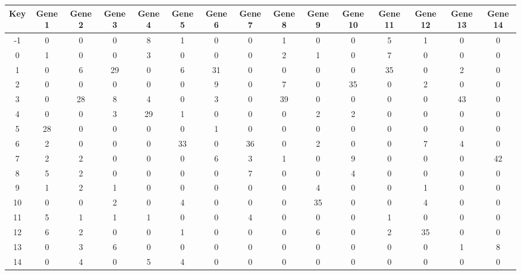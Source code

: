 \begin{tabular}{|c|c|c|c|c|c|c|c|c|c|c|c|c|c|c|}
\hline
Key & Gene 1 & Gene 2 & Gene 3 & Gene 4 & Gene 5 & Gene 6 & Gene 7 & Gene 8 & Gene 9 & Gene 10 & Gene 11 & Gene 12 & Gene 13 & Gene 14 \\
\hline
-1 & 0 & 0 & 0 & 8 & 1 & 0 & 0 & 1 & 0 & 0 & 5 & 1 & 0 & 0 \\
0 & 1 & 0 & 0 & 3 & 0 & 0 & 0 & 2 & 1 & 0 & 7 & 0 & 0 & 0 \\
1 & 0 & 6 & 29 & 0 & 6 & 31 & 0 & 0 & 0 & 0 & 35 & 0 & 2 & 0 \\
2 & 0 & 0 & 0 & 0 & 0 & 9 & 0 & 7 & 0 & 35 & 0 & 2 & 0 & 0 \\
3 & 0 & 28 & 8 & 4 & 0 & 3 & 0 & 39 & 0 & 0 & 0 & 0 & 43 & 0 \\
4 & 0 & 0 & 3 & 29 & 1 & 0 & 0 & 0 & 2 & 2 & 0 & 0 & 0 & 0 \\
5 & 28 & 0 & 0 & 0 & 0 & 1 & 0 & 0 & 0 & 0 & 0 & 0 & 0 & 0 \\
6 & 2 & 0 & 0 & 0 & 33 & 0 & 36 & 0 & 2 & 0 & 0 & 7 & 4 & 0 \\
7 & 2 & 2 & 0 & 0 & 0 & 6 & 3 & 1 & 0 & 9 & 0 & 0 & 0 & 42 \\
8 & 5 & 2 & 0 & 0 & 0 & 0 & 7 & 0 & 0 & 4 & 0 & 0 & 0 & 0 \\
9 & 1 & 2 & 1 & 0 & 0 & 0 & 0 & 0 & 4 & 0 & 0 & 1 & 0 & 0 \\
10 & 0 & 0 & 2 & 0 & 4 & 0 & 0 & 0 & 35 & 0 & 0 & 4 & 0 & 0 \\
11 & 5 & 1 & 1 & 1 & 0 & 0 & 4 & 0 & 0 & 0 & 1 & 0 & 0 & 0 \\
12 & 6 & 2 & 0 & 0 & 1 & 0 & 0 & 0 & 6 & 0 & 2 & 35 & 0 & 0 \\
13 & 0 & 3 & 6 & 0 & 0 & 0 & 0 & 0 & 0 & 0 & 0 & 0 & 1 & 8 \\
14 & 0 & 4 & 0 & 5 & 4 & 0 & 0 & 0 & 0 & 0 & 0 & 0 & 0 & 0 \\
\hline
\end{tabular}